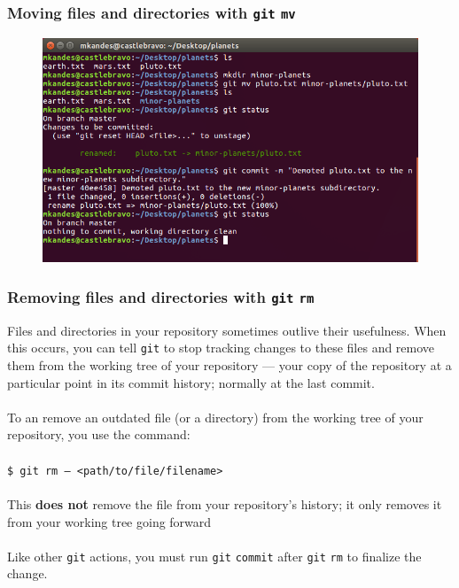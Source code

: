 \documentclass{beamer}
\begin{document}
\begin{frame}
   \frametitle{Moving files and directories with \texttt{git} \texttt{mv}}
   \begin{figure}[htbp]
      \includegraphics[width=1.0\textwidth]{images/git-mv.png}
   \end{figure}
\end{frame}

\begin{frame}
   \frametitle{Removing files and directories with \texttt{git} \texttt{rm}}
   Files and directories in your repository sometimes outlive their 
   usefulness. When this occurs, you can tell \texttt{git} to stop 
   tracking changes to these files and remove them from the working tree 
   of your repository --- your copy of the repository at a particular 
   point in its commit history; normally at the last commit.
   \\ \ \\
   To an remove an outdated file (or a directory) from the working tree 
   of your repository, you use the command:
   \\ \ \\
   \texttt{\hspace{1.0em}\$ git rm -- <path/to/file/filename>}
   \\ \ \\
   This \textbf{does not} remove the file from your repository's 
   history; it only removes it from your working tree going forward
   \\ \ \\
   Like other \texttt{git} actions, you must run \texttt{git} 
   \texttt{commit} after \texttt{git} \texttt{rm} to finalize the 
   change.
\end{frame}
\end{document}
